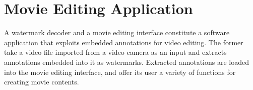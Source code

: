 \section{Movie Editing Application}
A watermark decoder and a movie editing interface constitute a software application that exploits embedded annotations for video editing.
The former take a video file imported from a video camera as an input and extracts annotations embedded into it as watermarks.
Extracted annotations are loaded into the movie editing interface, and offer its user a variety of functions for creating movie contents.
